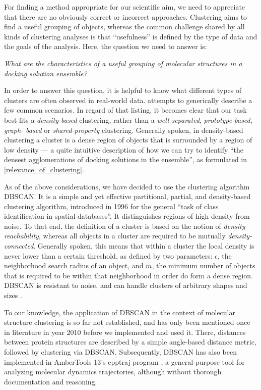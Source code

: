 For finding a method appropriate for our scientific aim, we need to appreciate
that there are no obviously correct or incorrect approaches. Clustering aims to
find a useful grouping of objects, whereas the common challenge shared by all
kinds of clustering analyses is that \enquote{usefulness} is defined by the type
of data and the goals of the analysis. Here, the question we need to answer is:

\begin{adjustwidth}{1.5cm}{1.5cm}
\textit{What are the characteristics of a useful grouping of
molecular structures in a docking solution ensemble?}
\end{adjustwidth}

In order to answer this question, it is helpful to know what different types of
clusters are often observed in real-world data. \cite{tan_data_mining} attempts
to generically describe a few common scenarios. In regard of that listing, it
becomes clear that our task best fits a \textit{density-based} clustering,
rather than a \textit{well-separated}, \textit{prototype-based}, \textit{graph-
based} or \textit{shared-property} clustering. Generally spoken, in
density-based clustering a cluster is a dense region of objects that is
surrounded by a region of low density --- a quite intuitive description of how
we can try to identify \enquote{the densest agglomerations of docking solutions
in the ensemble}, as formulated in \cref{relevance_of_clustering}.

As of the above considerations, we have decided to use the clustering algorithm
DBSCAN. It is a simple and yet effective partitional, partial, and density-based
clustering algorithm, introduced in 1996 \cite{dbscan_ester1996} for the general
\enquote{task of class identification in spatial databases}. It distinguishes
regions of high density from noise. To that end, the definition of a cluster is
based on the notion of \textit{density reachability}, whereas all objects in a
cluster are required to be mutually \textit{density-connected}. Generally
spoken, this means that within a cluster the local density is never lower than a
certain threshold, as defined by two parameters: $\epsilon$, the neighborhood
search radius of an object, and $m$, the minimum number of objects that is
required to be within that neighborhood in order do form a dense region. DBSCAN
is resistant to noise, and can handle clusters of arbitrary shapes and sizes
\cite{dbscan_ester1996}.

To our knowledge, the application of DBSCAN in the context of molecular
structure clustering is so far not established, and has only been mentioned once
in literature in year 2010 \cite{dbscan_usage_proteinstructures_2010} before we
implemented and used it. There, distances between protein structures are
described by a simple angle-based distance metric, followed by clustering via
DBSCAN. Subsequently, DBSCAN has also been implemented in AmberTools 13's
cpptraj program \cite{cpptraj_2013}, a general purpose tool for analyzing
molecular dynamics trajectories, although without thorough documentation and
reasoning.


